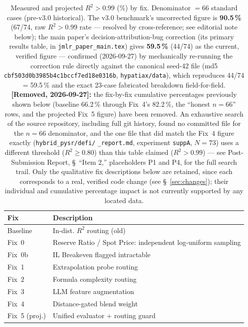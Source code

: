 \documentclass[twoside,11pt]{article}
\begin{document}
\begin{table}[h]
\centering
\caption{Measured and projected $R^2 > 0.99$ (\%) by fix.
         Denominator $= 66$ standard cases (pre-v3.0 historical). The
         v3.0 benchmark's uncorrected figure is \textbf{90.5\,\%} (67/74, raw
         $R^2>0.99$ rate --- resolved by cross-reference; see editorial
         note below); the
         main paper's decision-attribution-bug correction
         (its primary results table, in \texttt{jmlr\_paper\_main.tex})
         gives \textbf{59.5\,\%} (44/74) as the current, verified figure ---
         confirmed (2026-09-27) by mechanically re-running the correction
         rule directly against the canonical seed-42 file (md5
         \texttt{cbf503d0b3985b4c1bccf7ed18e0316b}, \texttt{hypatiax/data}), which reproduces
         44/74 = 59.5\,\% and the exact 23-case fabricated breakdown
         field-for-field. \textbf{[Removed, 2026-09-27]:} the fix-by-fix
         cumulative percentages previously shown below (baseline 66.2\,\%
         through Fix~4's 82.2\,\%, the ``honest $n{=}66$'' rows, and the
         projected Fix~5 figure) have been removed. An exhaustive search of
         the source repository, including full git history, found no
         committed file for the $n{=}66$ denominator, and the one file that
         did match the Fix~4 figure exactly (\texttt{hybrid\_pysr/defi/}
         \texttt{\_report.md}, experiment \texttt{suppA}, $N=73$) uses a
         different threshold ($R^2\geq0.80$) than this table claimed
         ($R^2>0.99$) --- see Post-Submission Report, \S~``Item 2,''
         placeholders P1 and P4, for the full search trail. Only the
         qualitative fix descriptions below are retained, since each
         corresponds to a real, verified code change (see
         \S~\ref{sec:changes}); their individual and cumulative
         percentage impact is not currently supported by any located data.}
\label{tab:projected}
\begin{tabular}{ll}
\toprule
\textbf{Fix} & \textbf{Description} \\
\midrule
Baseline    & In-dist. $R^2$ routing (old) \\
Fix~0       & Reserve Ratio / Spot Price: independent log-uniform sampling \\
Fix~0b      & IL Breakeven flagged intractable \\
Fix~1       & Extrapolation probe routing \\
Fix~2       & Formula complexity routing \\
Fix~3       & LLM feature augmentation \\
Fix~4       & Distance-gated blend weight \\
Fix~5 (proj.) & Unified evaluator + routing guard \\
\bottomrule
\end{tabular}
\end{table}
\end{document}
